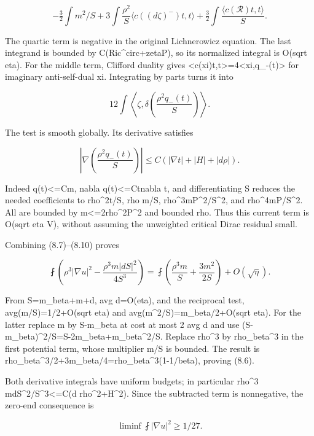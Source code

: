\documentclass[
  10pt,
]{article}
\begin{document}
\[
 -\tfrac32\int m^2/S
 +3\int\frac{\rho^2}{S}\langle c((d\zeta)^-)t,t\rangle
 +\tfrac32\int\frac{\langle c(\mathcal R)t,t\rangle}{S}. \tag{8.9}
\]

The quartic term is negative in the original Lichnerowicz equation. The
last integrand is bounded by
C(\textbar Ric\^{}circ\textbar+\textbar zeta\textbar\textbar P\textbar),
so its normalized integral is O(sqrt eta). For the middle term, Clifford
duality gives
\textless c(xi)t,t\textgreater=4\textless xi,q\_-(t)\textgreater{} for
imaginary anti-self-dual xi. Integrating by parts turns it into

\[
       12\int\left\langle\zeta,
              \delta\left(\frac{\rho^2q_-(t)}S\right)\right\rangle.
\]

The test is smooth globally. Its derivative satisfies

\[
 \left|\nabla\left(\frac{\rho^2q_-(t)}S\right)\right|
       \le C(|\nabla t|+|H|+|d\rho|).                \tag{8.10}
\]

Indeed \textbar q(t)\textbar\textless=Cm, \textbar nabla
q(t)\textbar\textless=C\textbar t\textbar\textbar nabla t\textbar, and
differentiating S reduces the needed coefficients to
rho\^{}2\textbar t\textbar/S, rho m/S,
rho\^{}3m\textbar P\textbar\^{}2/S\^{}2, and
rho\^{}4m\textbar P\textbar/S\^{}2. All are bounded by
m\textless=2rho\^{}2\textbar P\textbar\^{}2 and bounded rho. Thus this
current term is O(sqrt eta V), without assuming the unweighted critical
Dirac residual small.

Combining (8.7)--(8.10) proves

\[
 \fint\left(\rho^3|\nabla u|^2-\frac{\rho^3m|dS|^2}{4S^3}\right)
  =\fint\left(\frac{\rho^3m}{S}+\frac{3m^2}{2S}\right)
      +O(\sqrt\eta).
\]

From S=m\_beta+m+d, avg d=O(eta), and the reciprocal test,
avg(m/S)=1/2+O(sqrt eta) and avg(m\^{}2/S)=m\_beta/2+O(sqrt eta). For
the latter replace m by S-m\_beta at cost at most 2 avg d and use
(S-m\_beta)\^{}2/S=S-2m\_beta+m\_beta\^{}2/S. Replace rho\^{}3 by
rho\_beta\^{}3 in the first potential term, whose multiplier m/S is
bounded. The result is
rho\_beta\^{}3/2+3m\_beta/4=rho\_beta\^{}3(1-1/beta), proving (8.6).

Both derivative integrals have uniform budgets; in particular rho\^{}3
m\textbar dS\textbar\^{}2/S\^{}3\textless=C(\textbar d
rho\textbar\^{}2+\textbar H\textbar\^{}2). Since the subtracted term is
nonnegative, the zero-end consequence is

\[
             \liminf\fint|\nabla u|^2\ge1/27.        \tag{8.11}
\]
\end{document}
